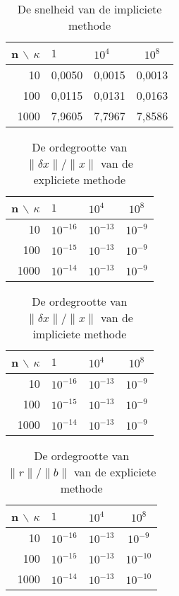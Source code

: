\begin{table}[H]
\begin{center}
\begin{tabular}{r|llc}
n $\backslash$ $\kappa$ & $1$ & $10^4$ & $10^8$ \\\hline
10 & 0,0050 & 0,0015 & 0,0013 \\
100 & 0,0115 & 0,0131 & 0,0163 \\
1000 & 7,9605 & 7,7967 & 7,8586
\end{tabular}
\end{center}
\caption{De snelheid van de impliciete methode}
\label{snelheid_imp}
\end{table}

\begin{table}[H]
\begin{center}
\begin{tabular}{r|llc}
n $\backslash$ $\kappa$ & $1$ & $10^4$ & $10^8$ \\\hline
10 & $10^{-16}$ & $10^{-13}$ & $10^{-9}$ \\
100 & $10^{-15}$ & $10^{-13}$ & $10^{-9}$ \\
1000 & $10^{-14}$ & $10^{-13}$ & $10^{-9}$
\end{tabular}
\end{center}
\caption{De ordegrootte van $\lVert \delta x \rVert/\lVert x \rVert$ van de expliciete methode}
\label{dx_exp}
\end{table}

\begin{table}[H]
\begin{center}
\begin{tabular}{r|llc}
n $\backslash$ $\kappa$ & $1$ & $10^4$ & $10^8$ \\\hline
10 & $10^{-16}$ & $10^{-13}$ & $10^{-9}$ \\
100 & $10^{-15}$ & $10^{-13}$ & $10^{-9}$ \\
1000 & $10^{-14}$ & $10^{-13}$ & $10^{-9}$
\end{tabular}
\end{center}
\caption{De ordegrootte van $\lVert \delta x \rVert/\lVert x \rVert$ van de impliciete methode}
\label{dx_imp}
\end{table}

\begin{table}[H]
\begin{center}
\begin{tabular}{r|llc}
n $\backslash$ $\kappa$ & $1$ & $10^4$ & $10^8$ \\\hline
10 & $10^{-16}$ & $10^{-13}$ & $10^{-9}$ \\
100 & $10^{-15}$ & $10^{-13}$ & $10^{-10}$ \\
1000 & $10^{-14}$ & $10^{-13}$ & $10^{-10}$
\end{tabular}
\end{center}
\caption{De ordegrootte van $\lVert r \rVert/\lVert b \rVert$ van de expliciete methode}
\label{rb_exp}
\end{table}

